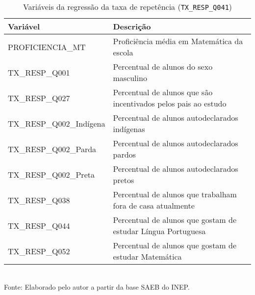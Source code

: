 \documentclass[english, spanish, brazilian]{RBIEarticle} %
\begin{document}
\begin{table}[htbp]
\centering
\caption{Variáveis da regressão da taxa de repetência (\texttt{TX\_RESP\_Q041})}
\label{tab:vars_tx_resp_q041}
\small
\begin{tabular}{lp{10cm}}
\hline
\textbf{Variável} & \textbf{Descrição} \\
\hline
PROFICIENCIA\_MT & Proficiência média em Matemática da escola \\
TX\_RESP\_Q001 & Percentual de alunos do sexo masculino \\
TX\_RESP\_Q027 & Percentual de alunos que são incentivados pelos pais ao estudo \\
TX\_RESP\_Q002\_Indígena & Percentual de alunos autodeclarados indígenas \\
TX\_RESP\_Q002\_Parda & Percentual de alunos autodeclarados pardos \\
TX\_RESP\_Q002\_Preta & Percentual de alunos autodeclarados pretos \\
TX\_RESP\_Q038 & Percentual de alunos que trabalham fora de casa atualmente \\
TX\_RESP\_Q044 & Percentual de alunos que gostam de estudar Língua Portuguesa \\
TX\_RESP\_Q052 & Percentual de alunos que gostam de estudar Matemática \\
\hline
\end{tabular}
\\[2mm]
\footnotesize\centering Fonte: Elaborado pelo autor a partir da base SAEB do INEP.
\end{table}























\pagebreak
\pagebreak
\nocite{*}
\printbibliography
\end{document}
